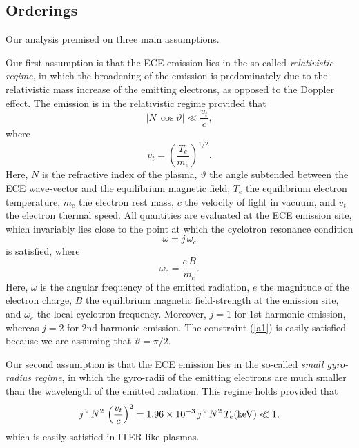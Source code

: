 \documentclass[12pt,prb,aps]{revtex4-1}
\begin{document}
\subsection{Orderings}
Our analysis premised on three main assumptions. 

Our first assumption is that the ECE emission lies in the so-called {\em relativistic regime}, in which the
broadening of the emission is predominately due to the relativistic mass increase of the emitting electrons, as opposed to the Doppler effect. The
emission is in the relativistic regime provided that
\begin{equation}\label{a1}
|N\,\cos\vartheta|  \ll \frac{v_t}{c},
\end{equation}
where
\begin{equation}
v_t = \left(\frac{T_e}{m_e}\right)^{1/2}.
\end{equation}
Here, $N$ is the refractive index of the plasma, $\vartheta$ the angle subtended between the ECE wave-vector and the equilibrium magnetic field, $T_e$ the equilibrium electron
temperature, $m_e$ the electron rest mass, $c$ the velocity of light in vacuum, and $v_t$ the electron thermal speed.  All quantities are evaluated at the ECE emission site, which invariably
lies 
close to the point at which the cyclotron resonance condition
\begin{equation}
\omega = j\,\omega_c
\end{equation}
is satisfied, 
where 
\begin{equation}
\omega_c = \frac{e\,B}{m_e}.
\end{equation}
Here, $\omega$ is the angular frequency of the emitted radiation, $e$ the magnitude of the electron charge, $B$ the equilibrium magnetic field-strength at the emission site, and $\omega_c$  the local cyclotron frequency. 
Moreover, $j=1$ for 1st harmonic emission, whereas $j=2$ for 2nd harmonic emission. The constraint (\ref{a1}) is easily satisfied because we are assuming that
$\vartheta=\pi/2$. 

Our second assumption is that the ECE emission lies in the so-called {\em small gyro-radius regime}, in which the gyro-radii of the emitting electrons are much smaller than
the wavelength of the emitted radiation. This regime holds provided that 
\begin{equation}
j^{\,2}\,N^2\,\left(\frac{v_t}{c}\right)^2 = 1.96\times 10^{-3}\,j^{\,2}\,N^2\,T_e({\rm keV}) \ll 1,
\end{equation}
which is easily satisfied in ITER-like plasmas. 
\end{document}
